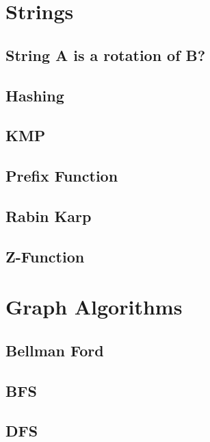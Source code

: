 \section{Strings}
\subsection{String A is a rotation of B?}
\raggedbottom
\hrulefill
\subsection{Hashing}
\raggedbottom
\hrulefill
\subsection{KMP}
\raggedbottom
\hrulefill
\subsection{Prefix Function}
\raggedbottom
\hrulefill
\subsection{Rabin Karp}
\raggedbottom
\hrulefill
\subsection{Z-Function}
\raggedbottom
\hrulefill

\section{Graph Algorithms}
\subsection{Bellman Ford}
\raggedbottom
\hrulefill
\subsection{BFS}
\raggedbottom
\hrulefill
\subsection{DFS}
\raggedbottom
\hrulefill
